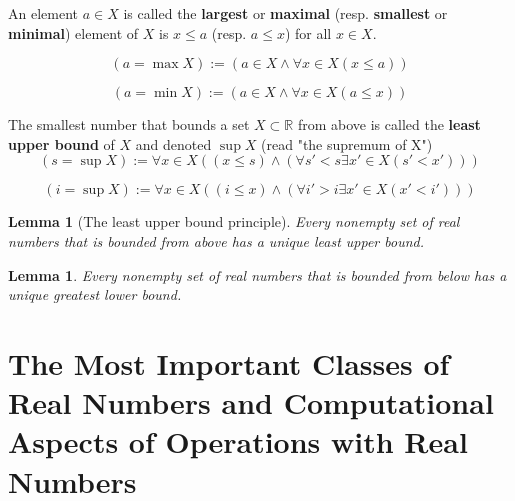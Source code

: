 \documentclass[letter]{article}
\newcommand{\R}{\mathbb{R}}
\newtheorem{lemma}[theorem]{Lemma}
\newenvironment{definition}[1][Definition]{\begin{trivlist}
\item[\hskip \labelsep {\bfseries #1}]}{\end{trivlist}}
\begin{document}
\begin{definition}
An element $a \in X$ is called the \textbf{largest} or \textbf{maximal} (resp. \textbf{smallest} or \textbf{minimal}) element of $X$ is $x \leq a$ (resp. $a\leq x$) for all $x\in X$.
\end{definition}
\begin{definition}
\[
(a = \max X) := (a \in X \wedge \forall x \in X (x\leq a))
\]
\end{definition}
\begin{definition}
\[
(a = \min X) := (a \in X \wedge \forall x \in X (a\leq x))
\]
\end{definition}
\begin{definition}
The smallest number that bounds a set $X \subset \R$ from above is called the \textbf{least upper bound} of $X$ and denoted $\sup X$ (read "the supremum of X")
\[
(s = \sup X) := \forall x \in X ( (x\leq s) \wedge (\forall s' < s \exists x' \in X (s'<x')))
\]
\end{definition}

\begin{definition}
\[
(i = \sup X) := \forall x \in X ( (i\leq x) \wedge (\forall i' > i \exists x' \in X (x'<i')))
\]
\end{definition}

\begin{lemma}[The least upper bound principle]
Every nonempty set of real numbers that is bounded from above has a unique least upper bound.
\end{lemma}

\begin{lemma}
Every nonempty set of real numbers that is bounded from below has a unique greatest lower bound.
\end{lemma}

\section{The Most Important Classes of Real Numbers and Computational Aspects of Operations with Real Numbers}
\end{document}
